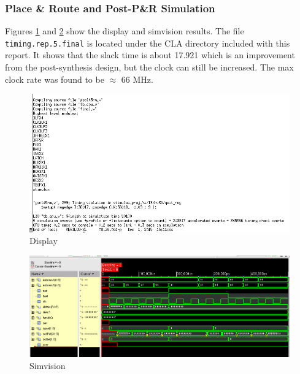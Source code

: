 \documentclass[12pt]{article}
\begin{document}
\subsubsection{Place \& Route and Post-P\&R Simulation}
Figures \ref{fig:encounter-text-CLA} and \ref{fig:encounter-test-CLA} show the display and simvision results. The file \texttt{timing.rep.5.final} is located under the CLA directory included with this report. It shows that the slack time is about 17.921 which is an improvement from the post-synthesis design, but the clock can still be increased. The max clock rate was found to be $\approx$ 66 MHz.
\begin{figure}[H]
\centering
\includegraphics[width=.7\linewidth]{../CLA/encounter-text}
\caption{Display}
\label{fig:encounter-text-CLA}
\end{figure}

\begin{figure}[H]
\centering
\includegraphics[width=\linewidth]{../CLA/encounter-test}
\caption{Simvision}
\label{fig:encounter-test-CLA}
\end{figure}
\end{document}
